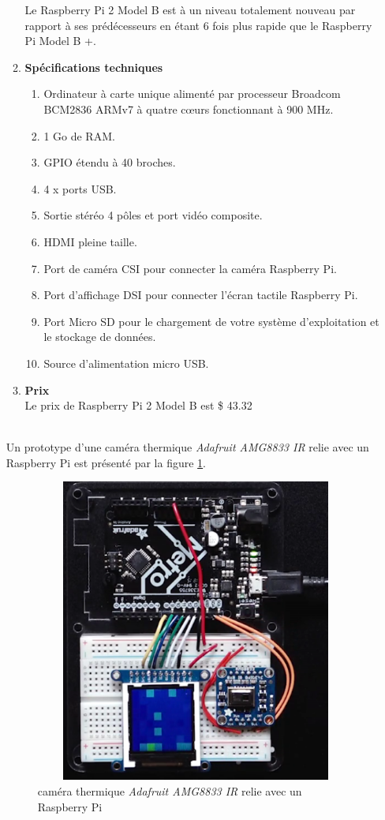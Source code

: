 \documentclass[12pt]{article}
\begin{document}
\begin{itemize}
\begin{enumerate}
		Le Raspberry Pi 2 Model B est à un niveau totalement nouveau par rapport à ses prédécesseurs en étant 6 fois plus rapide que le Raspberry Pi Model B +.
	\item \textbf{Spécifications techniques}\\
		\begin{enumerate}
			\item Ordinateur à carte unique alimenté par processeur Broadcom BCM2836 ARMv7 à quatre cœurs fonctionnant à 900 MHz.
			\item 1 Go de RAM.
			\item GPIO étendu à 40 broches.
			\item 4 x ports USB.
			\item Sortie stéréo 4 pôles et port vidéo composite.
			\item HDMI pleine taille.
			\item Port de caméra CSI pour connecter la caméra Raspberry Pi.
			\item Port d’affichage DSI pour connecter l’écran tactile Raspberry Pi.
			\item Port Micro SD pour le chargement de votre système d'exploitation et le stockage de données.
			\item Source d'alimentation micro USB.
\end{enumerate}
	\item \textbf{Prix}\\
	Le prix de Raspberry Pi 2 Model B est \$ 43.32
	
	\end{enumerate}\\
	
	Un prototype d'une caméra thermique \textit{Adafruit AMG8833 IR} relie avec un Raspberry Pi est présenté par la figure \ref{fig:raspther}.
	\begin{figure}[h]
				\centering
		\includegraphics[height=10cm,width=12cm]{img-Chapiter-3/therPi.png}
		\caption{caméra thermique \textit{Adafruit AMG8833 IR} relie avec un Raspberry Pi }
		\label{fig:raspther}
	\end{figure}
\end{itemize}
\end{document}
